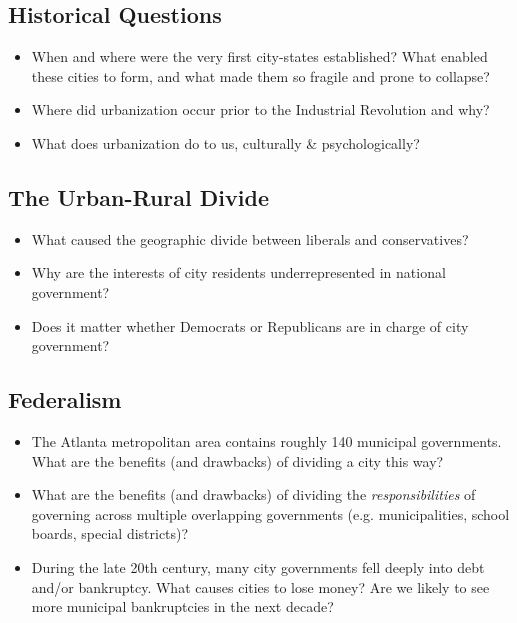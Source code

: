 \documentclass[11pt, letterpaper]{article}
\begin{document}
\subsection*{Historical Questions}

\begin{itemize}
	\item When and where were the very first city-states established? What enabled these cities to form, and what made them so fragile and prone to collapse? %
	\item Where did urbanization occur prior to the Industrial Revolution and why?
	\item What does urbanization do to us, culturally \& psychologically?
\end{itemize}
	

\subsection*{The Urban-Rural Divide}

\begin{itemize}
	\item What caused the geographic divide between liberals and conservatives? %
	\item Why are the interests of city residents underrepresented in national government? %
	\item Does it matter whether Democrats or Republicans are in charge of city government?
\end{itemize}

\subsection*{Federalism}

\begin{itemize}
	\item The Atlanta metropolitan area contains roughly 140 municipal governments. What are the benefits (and drawbacks) of dividing a city this way?
	\item What are the benefits (and drawbacks) of dividing the \textit{responsibilities} of governing across multiple overlapping governments (e.g. municipalities, school boards, special districts)? %
	\item During the late 20th century, many city governments fell deeply into debt and/or bankruptcy. What causes cities to lose money? Are we likely to see more municipal bankruptcies in the next decade?
\end{itemize}
\end{document}
